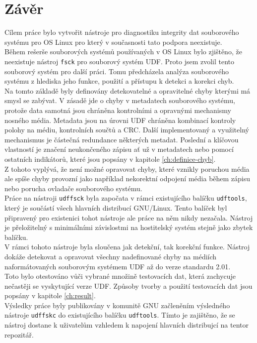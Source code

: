 \chapter{Závěr}
Cílem práce bylo vytvořit nástroje pro diagnostiku integrity dat souborového systému pro OS Linux pro který v současnosti tato podpora neexistuje.\\
Během rešerše souborových systémů používaných v OS Linux bylo zjištěno, že neexistuje nástroj \texttt{fsck} pro souborový systém UDF. Proto jsem zvolil tento souborový systém pro další práci. Tomu předcházela analýza souborového systému z hlediska jeho funkce, použití a přístupu k detekci a korekci chyb.\\
Na tomto základě byly definovány detekovatelné a opravitelné chyby kterými má smysl se zabývat. V zásadě jde o chyby v metadatech souborového systému, protože data samotná jsou chráněna kontrolními a opravnými mechanismy nosného média. Metadata jsou na úrovni UDF chráněna kombinací kontroly polohy na médiu, kontrolních součtů a CRC. Další implementovaný a využitelný mechanismus je částečná redundance některých metadat. Poslední a klíčovou vlastností je značení neukončeného zápisu ať už v metadatech nebo pomocí ostatních indikátorů, které jsou popsány v kapitole \ref{ch:definice-chyb}.\\
Z tohoto vyplývá, že není možné opravovat chyby, které vznikly poruchou média ale spíše chyby provozní jako například nekorektní odpojení média během zápisu nebo porucha ovladače souborového systému.\\
Práce na nástroji \texttt{udffsck} byla započata v rámci existujícího balíčku \texttt{udftools}, který je součástí všech hlavních distribucí GNU/Linux. Tento balíček byl připravený pro existenici tohot nástroje ale práce na něm nikdy nezačala. Nástroj je přeložitelný s minimálními závislostmi na hostitelský systém stejně jako zbytek balíčku.\\
V rámci tohoto nástroje byla sloučena jak detekční, tak korekční funkce. Nástroj dokáže detekovat a opravovat všechny nadefinované chyby na médiích naformátovaných souborovým systémem UDF až do verze standardu 2.01.\\
Toto bylo otestováno vůči vybrané množině testovacích dat, která zachycuje nečastěji se vyskytující verze UDF. Způsoby tvorby a použití testovacích dat jsou popsány v kapitole \ref{ch:result}.\\
Výsledky práce byly publikovány v komunitě GNU začleněním výsledného nástroje \texttt{udffskc} do existujícího balíčku \texttt{udftools}. Tímto je zajištěno, že se nástroj dostane k uživatelům vzhledem k napojení hlavních distribujcí na tentor repozitář.\\

